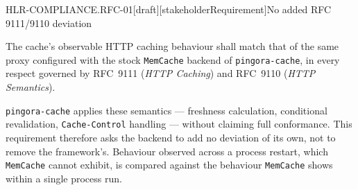 \begin{requirement}{HLR-COMPLIANCE.RFC-01}[draft][stakeholderRequirement]{No added RFC 9111/9110 deviation}


  The cache's observable HTTP caching behaviour shall match that of the same
  proxy configured with the stock \texttt{MemCache} backend of
  \texttt{pingora-cache}, in every respect governed by RFC~9111 (\emph{HTTP Caching}) and
  RFC~9110 (\emph{HTTP Semantics}).

  \texttt{pingora-cache} applies these semantics --- freshness calculation,
  conditional revalidation, \texttt{Cache-Control} handling --- without
  claiming full conformance. This requirement therefore asks the backend to
  add no deviation of its own, not to remove the framework's. Behaviour
  observed across a process restart, which \texttt{MemCache} cannot exhibit,
  is compared against the behaviour \texttt{MemCache} shows within a single
  process run.



\end{requirement}
